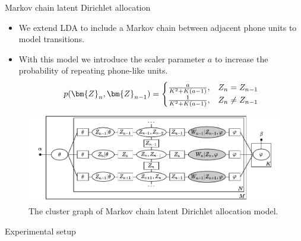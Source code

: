 \documentclass[final]{beamer}
\begin{document}
\begin{frame}[t]
\begin{columns}[T]
\begin{column}{.33\linewidth}
\begin{minipage}[T]{.97\textwidth}
{\begin{block}{Markov chain latent Dirichlet allocation}
                        \begin{itemize}
                            \vspace{-0.5cm}
                            \setlength{\itemsep}{0.5ex}
                            \item We extend LDA to include a Markov chain between adjacent phone units to model transitions.
                            \item With this model we introduce the scaler parameter $a$ to increase the probability of repeating phone-like units.
                            $$
                            \setlength\itemsep{0em}
                            p(\bm{Z}_n,\bm{Z}_{n-1}) =
                            \begin{cases}
                              \frac{a}{K^2 + K(a-1)}, & Z_n = Z_{n-1}    \\
                              \frac{1}{K^2 + K(a-1)}, & Z_n \neq Z_{n-1}
                            \end{cases}
                            \label{eq:transition_probability}
                         $$
                            \end{itemize}

                        \vspace{-0.5cm}
                        \begin{figure}[t]
                            \centering
                            \includegraphics[width=\linewidth]{figures/werner_lda}
                            \caption{The cluster graph of Markov chain latent Dirichlet allocation model.}
                            \label{fig:base_lda}
                        \end{figure}

                    \end{block}

                    \begin{block}{Experimental setup}


\end{block}}
\end{minipage}
\end{column}
\end{columns}
\end{frame}
\end{document}

